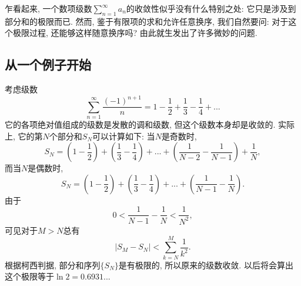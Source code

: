 

乍看起来, 一个数项级数$\sum_{n=1}^\infty a_n$的收敛性似乎没有什么特别之处: 它只是涉及到部分和的极限而已. 然而, 鉴于有限项的求和允许任意换序, 我们自然要问: 对于这个极限过程, 还能够这样随意换序吗? 由此就生发出了许多微妙的问题.

\subsection{从一个例子开始}

考虑级数
$$
\sum_{n=1}^\infty\frac{(-1)^{n+1}}{n}
=1-\frac{1}{2}+\frac{1}{3}-\frac{1}{4}+...
$$
它的各项绝对值组成的级数是发散的调和级数, 但这个级数本身却是收敛的. 实际上, 它的第$N$个部分和$S_N$可以计算如下: 当$N$是奇数时,
$$
S_N=\left(1-\frac{1}{2}\right)+\left(\frac{1}{3}-\frac{1}{4}\right)+...+\left(\frac{1}{N-2}-\frac{1}{N-1}\right)+\frac{1}{N},
$$
而当$N$是偶数时,
$$
S_N=\left(1-\frac{1}{2}\right)+\left(\frac{1}{3}-\frac{1}{4}\right)+...+\left(\frac{1}{N-1}-\frac{1}{N}\right).
$$
由于
$$
0<\frac{1}{N-1}-\frac{1}{N}<\frac{1}{N^2},
$$
可见对于$M>N$总有
$$
|S_M-S_N|<\sum_{k=N}^M\frac{1}{k^2}.
$$
根据柯西判据, 部分和序列$\{S_N\}$是有极限的, 所以原来的级数收敛. 以后将会算出这个极限等于$\ln2=0.6931...$